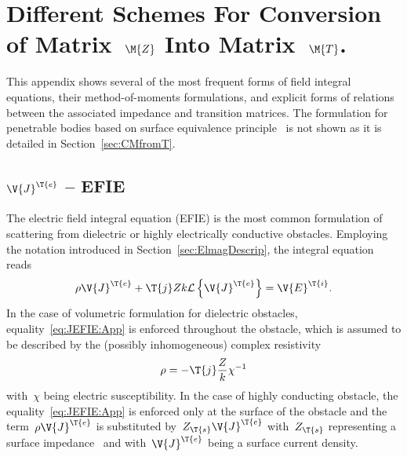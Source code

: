 \documentclass[journal]{IEEEtran}
\providecommand{\Je}{\V{J}^\T{e}} %
\providecommand{\Ei}{\V{E}^{\T{i}}} %
\begin{document}
\section{Different Schemes For Conversion of Matrix~$\M{Z}$ Into Matrix~$\M{T}$.}
\label{App:IEformulations}

This appendix shows several of the most frequent forms of field integral equations, their method-of-moments formulations, and explicit forms of relations between the associated impedance and transition matrices. The formulation for penetrable bodies based on surface equivalence principle~\cite{ChangHarrington_AsurfaceFormulationForCharacteristicModesOfMaterialBodies} is not shown as it is detailed in Section~\ref{sec:CMfromT}. 

\subsection{$\Je$ -- EFIE}
\label{sec:JEFIE}
The electric field integral equation (EFIE) is the most common formulation of scattering from dielectric or highly electrically conductive obstacles. Employing the notation introduced in Section~\ref{sec:ElmagDescrip}, the integral equation reads
\begin{equation}
\label{eq:JEFIE:App}
     \rho \Je + \T{j} Z k \mathcal{L} \left\{ \Je \right\} = \Ei.
\end{equation}
In the case of volumetric formulation for dielectric obstacles, equality~\eqref{eq:JEFIE:App} is enforced throughout the obstacle, which is assumed to be described by the (possibly inhomogeneous) complex resistivity
\begin{equation}
    \rho =  -  \T{j} \dfrac{ Z}{k} \chi^{-1}
\end{equation}
with~$\chi$ being electric susceptibility. In the case of highly conducting obstacle, the equality~\eqref{eq:JEFIE:App} is enforced only at the surface of the obstacle and the term~$\rho \Je$ is substituted by~$Z_\T{s} \Je$ with~$Z_\T{s}$ representing a surface impedance~\cite{Jackson_ClassicalElectrodynamics,SenoirVolakis_ApproximativeBoundaryConditionsInEM} and with~$\Je$ being a surface current density.
\end{document}
